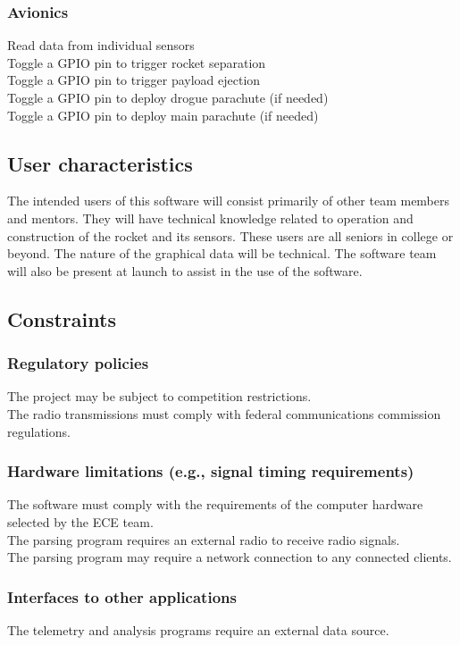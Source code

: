 \documentclass[onecolumn, draftclsnofoot, 10pt, compsoc]{IEEEtran}
\begin{document}
\subsubsection{Avionics}
Read data from individual sensors\\
Toggle a GPIO pin to trigger rocket separation\\
Toggle a GPIO pin to trigger payload ejection\\
Toggle a GPIO pin to deploy drogue parachute (if needed)\\
Toggle a GPIO pin to deploy main parachute (if needed)

\subsection{User characteristics}
The intended users of this software will consist primarily of other team members and mentors. They will have technical knowledge related to operation and construction of the rocket and its sensors. These users are all seniors in college or beyond. The nature of the graphical data will be technical. The software team will also be present at launch to assist in the use of the software.

\subsection{Constraints}
\subsubsection{Regulatory policies}
The project may be subject to competition restrictions.\\
The radio transmissions must comply with federal communications commission regulations.

\subsubsection{Hardware limitations (e.g., signal timing requirements)}
The software must comply with the requirements of the computer hardware selected by the ECE team.\\
The parsing program requires an external radio to receive radio signals.\\
The parsing program may require a network connection to any connected clients.

\subsubsection{Interfaces to other applications}
The telemetry and analysis programs require an external data source.
\end{document}
